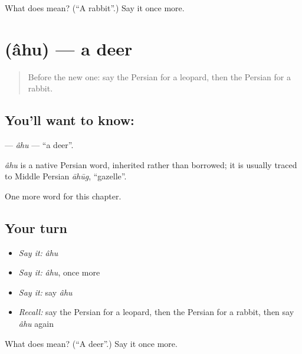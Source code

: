 \begin{tcolorbox}[breakable,colback=teal!4,colframe=teal!35!black,title={Before you move on}]
What does  mean? (\textquotedblleft{}A rabbit\textquotedblright{}.) Say it once more.
\end{tcolorbox}
\section[\texorpdfstring{\fa{آهو} (âhu)}{آهو (âhu)}]{ (âhu) — a deer}

\label{lesson:FA-C105-ahu}



\begin{quote}
Before the new one: say the Persian for a leopard, then the Persian for a rabbit.
\end{quote}

\subsection*{You'll want to know: }
\textbf{} — \emph{âhu} — \textquotedblleft{}a deer\textquotedblright{}.

\begin{cousinweb}
\emph{âhu} is a native Persian word, inherited rather than borrowed; it is usually traced to Middle Persian \emph{āhūg}, \textquotedblleft{}gazelle\textquotedblright{}.
\end{cousinweb}

\begin{grammarlens}[title={What you've built}]
One more word for this chapter.
\end{grammarlens}

\subsection*{Your turn}
\begin{itemize}
\raggedright
  \item \emph{Say it:} \emph{âhu}
  \item \emph{Say it:} \emph{âhu}, once more
  \item \emph{Say it:} say \emph{âhu}
  \item \emph{Recall:} say the Persian for a leopard, then the Persian for a rabbit, then say \emph{âhu} again
\end{itemize}

\begin{tcolorbox}[breakable,colback=teal!4,colframe=teal!35!black,title={Before you move on}]
What does  mean? (\textquotedblleft{}A deer\textquotedblright{}.) Say it once more.
\end{tcolorbox}
